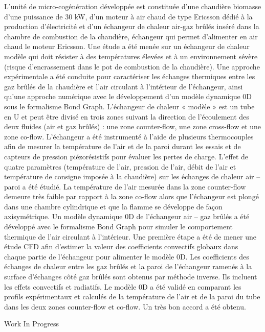 {\normalsize
L'unité de micro-cogénération développée est constituée d'une chaudière biomasse d'une puissance de 30 kW, d'un moteur à air chaud de type Ericsson dédié à la production d'électricité et d'un échangeur de chaleur air-gaz brûlés inséré dans la chambre de combustion de la chaudière, échangeur qui permet d'alimenter en air chaud le moteur Ericsson. Une étude a été menée sur un échangeur de chaleur modèle qui doit résister à des températures élevées et à un environnement sévère (risque d'encrassement dans le pot de combustion de la chaudière). Une approche expérimentale a été conduite pour caractériser les échanges thermiques entre les gaz brûlés de la chaudière et l'air circulant à l'intérieur de l'échangeur, ainsi qu'une approche numérique avec le développement d'un modèle dynamique 0D sous le formalisme Bond Graph. L'échangeur de chaleur « modèle » est un tube en U et peut être divisé en trois zones suivant la direction de l'écoulement des deux fluides (air et gaz brûlés) : une zone counter-flow, une zone cross-flow et une zone co-flow. L'échangeur a été instrumenté à l'aide de plusieurs thermocouples afin de mesurer la température de l'air et de la paroi durant les essais et de capteurs de pression piézorésistifs pour évaluer les pertes de charge. L'effet de quatre paramètres (température de l'air, pression de l'air, débit de l'air et température de consigne imposée à la chaudière) sur les échanges de chaleur air – paroi a été étudié. La température de l'air mesurée dans la zone counter-flow demeure très faible par rapport à la zone co-flow alors que l'échangeur est plongé dans une chambre cylindrique et que la flamme se développe de façon axisymétrique. Un modèle dynamique 0D de l'échangeur air – gaz brûlés a été développé avec le formalisme Bond Graph pour simuler le comportement thermique de l'air circulant à l'intérieur. Une première étape a été de mener une étude CFD afin d'estimer la valeur des coefficients convectifs globaux dans chaque partie de l'échangeur pour alimenter le modèle 0D. Les coefficients des échanges de chaleur entre les gaz brûlés et la paroi de l'échangeur ramenés à la surface d'échanges côté gaz brûlés sont obtenus par méthode inverse. Ils incluent les effets convectifs et radiatifs. Le modèle 0D a été validé en comparant les profils expérimentaux et calculés de la température de l'air et de la paroi du tube dans les deux zones counter-flow et co-flow. Un très bon accord a été obtenu.

 \vfill Work In Progress

}
 
